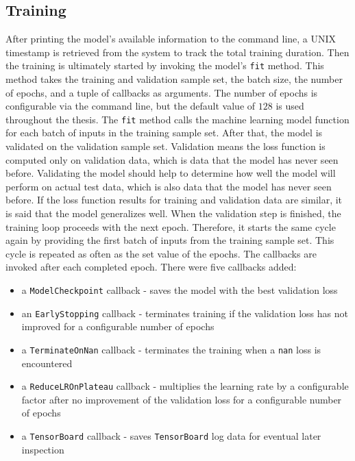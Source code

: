 \documentclass[draft,final]{vutinfth} %
\begin{document}
    \subsection{Training}
    After printing the model's available information to the command line, a UNIX timestamp is retrieved from the system to track the total training duration.
    Then the training is ultimately started by invoking the model's \texttt{fit} method. This method takes the training and validation sample set, the batch size, the number of epochs, and a tuple of callbacks as arguments.
    The number of epochs is configurable via the command line, but the default value of $128$ is used throughout the thesis.
    The \texttt{fit} method calls the machine learning model function for each batch of inputs in the training sample set. After that, the model is validated on the validation sample set.
    Validation means the loss function is computed only on validation data, which is data that the model has never seen before.
    Validating the model should help to determine how well the model will perform on actual test data, which is also data that the model has never seen before.
    If the loss function results for training and validation data are similar, it is said that the model generalizes well.
    When the validation step is finished, the training loop proceeds with the next epoch. Therefore, it starts the same cycle again by providing the first batch of inputs from the training sample set.
    This cycle is repeated as often as the set value of the epochs.
    The callbacks are invoked after each completed epoch. There were five callbacks added:
    \begin{itemize}
        \item{}
        a \texttt{ModelCheckpoint} callback - saves the model with the best validation loss
        \item{}
        an \texttt{EarlyStopping} callback - terminates training if the validation loss has not improved for a configurable number of epochs
        \item{}
        a \texttt{TerminateOnNan} callback - terminates the training when a \texttt{nan} loss is encountered
        \item{}
        a \texttt{ReduceLROnPlateau} callback - multiplies the learning rate by a configurable factor after no improvement of the validation loss for a configurable number of epochs
        \item{}
        a \texttt{TensorBoard} callback - saves \texttt{TensorBoard} log data for eventual later inspection
    \end{itemize}
\end{document}
